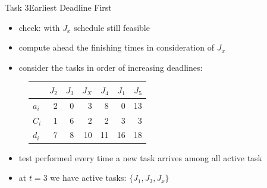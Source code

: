 \begin{frame}[allowframebreaks]{Task 3}{Earliest Deadline First\vspace{0.5cm}}
  \begin{itemize}
    \item \alert{check:} with $J_x$ schedule \alert{still feasible}
    \item compute \alert{ahead} the \alert{finishing times} in consideration of $J_x$
    \item consider the tasks \alert{in order of increasing deadlines:}
  \end{itemize}
  \begin{figure}
  \centering
  \begin{tabular}{|l|r|r|r|r|r|r|}
    \hline             & $J_2$ & $J_3$ & $J_X$ & $J_4$ & $J_1$ & $J_5$ \\
    \hline \hline$a_i$ & 2     & 0     & 3     & 8     & 0     & 13 \\
    \hline$C_i$        & 1     & 6     & 2     & 2     & 3     & 3 \\
    \hline$d_i$        & 7     & 8     & 10    & 11    & 16    & 18 \\
    \hline
  \end{tabular}
  \end{figure}
  \begin{itemize}
    \item test performed every time a new \alert{task arrives} among \alert{all active task}
  \item at $t = 3$ we have active tasks: $\{J_1, J_3, J_x\}$
    \begin{itemize}

\end{itemize}
\end{itemize}
\end{frame}
